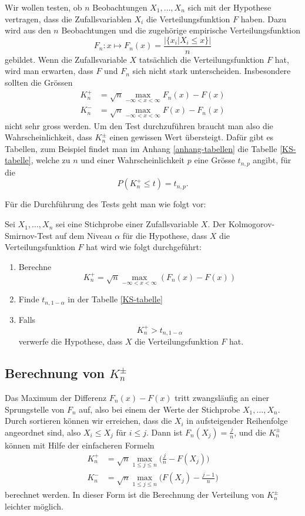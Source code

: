 Wir wollen testen, ob $n$ Beobachtungen $X_1,\dots,X_n$ sich mit
der Hypothese vertragen, dass die Zufallsvariablen $X_i$ die
Verteilungsfunktion $F$ haben.
Dazu wird aus den $n$ Beobachtungen
und die zugehörige empirische Verteilungsfunktion
\[
F_n\colon x\mapsto F_n(x)=\frac{|\{x_i|X_i\le x\}|}{n}
\]
gebildet.
Wenn die Zufallsvariable $X$ tatsächlich die
Verteilungsfunktion $F$ hat, wird man erwarten,
dass $F$ und $F_n$ sich nicht stark unterscheiden.
Insbesondere sollten die Grössen
\begin{align}
K_n^+
&=
\sqrt{n}\max_{-\infty<x<\infty} F_n(x)-F(x)
\\
K_n^-
&=
\sqrt{n}\max_{-\infty<x<\infty} F(x)-F_n(x)
\end{align}
nicht sehr gross werden.
Um den Test durchzuführen braucht man also
die Wahrscheinlichkeit, dass $K_n^{\pm}$ einen gewissen Wert übersteigt.
Dafür gibt es Tabellen, zum Beispiel findet man im Anhang \ref{anhang-tabellen}
die Tabelle \ref{KS-tabelle}, welche zu $n$ und einer Wahrscheinlichkeit
$p$ eine Grösse $t_{n,p}$ angibt, für die
\[
P(K_n^+\le t)=t_{n,p}.
\]

Für die Durchführung des Tests geht man wie folgt vor:
\begin{satz} Sei $X_1,\dots,X_n$ sei eine Stichprobe einer Zufallsvariable $X$.
Der Kolmogorov-Smirnov-Test auf dem Niveau $\alpha$ für die Hypothese,
dass $X$ die Verteilungsfunktion $F$ hat wird wie folgt durchgeführt:
\begin{enumerate}
\item Berechne
\[
K_n^+ = \sqrt{n}\max_{-\infty<x<\infty} (F_n(x)-F(x))
\]
\item Finde $t_{n,1-\alpha}$ in der Tabelle \ref{KS-tabelle}
\item Falls
\[
K_n^+>t_{n,1-\alpha}
\]
verwerfe die Hypothese, dass $X$ die Verteilungsfunktion $F$ hat.
\end{enumerate}
\end{satz}

\subsection{Berechnung von \texorpdfstring{$K_n^{\pm}$}{Kn-plus-minus}}
Das Maximum der Differenz $F_n(x)-F(x)$ tritt zwangsläufig an einer
Sprungstelle von $F_n$ auf, also bei einem der Werte der Stichprobe
$X_1,\dots,X_n$.
Durch sortieren können wir erreichen, dass die
$X_i$  in aufsteigender Reihenfolge angeordnet sind, also $X_i\le X_j$
für $i\le j$.
Dann ist $F_n(X_j)=\frac{j}{n}$, und
die  $K_n^{\pm}$ können mit Hilfe der einfacheren Formeln
\begin{align}
K_n^+
&=
\sqrt{n}\max_{1\le j\le n}\biggl(\frac{j}{n}-F(X_j)\biggr)
\label{knp-berechnungs-formel}
\\
K_n^-
&=
\sqrt{n}\max_{1\le j\le n}\biggl(F(X_j)-\frac{j-1}n\biggr)
\end{align}
berechnet werden.
In dieser Form ist die Berechnung der
Verteilung von $K_n^{\pm}$ leichter möglich.

